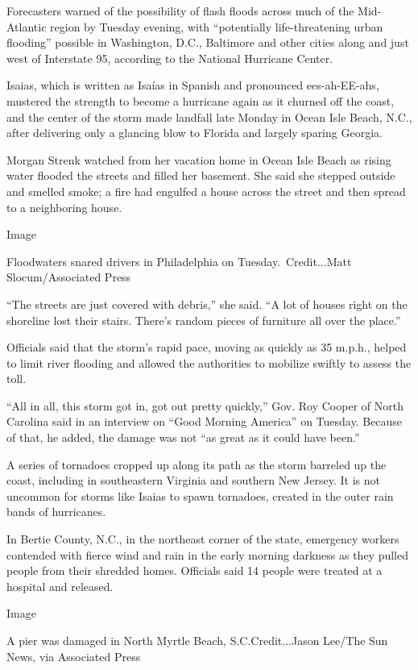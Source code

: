 Forecasters warned of the possibility of flash floods across much of the
Mid-Atlantic region by Tuesday evening, with ``potentially
life-threatening urban flooding'' possible in Washington, D.C.,
Baltimore and other cities along and just west of Interstate 95,
according to the National Hurricane Center.

Isaias, which is written as Isaías in Spanish and pronounced
ees-ah-EE-ahs, mustered the strength to become a hurricane again as it
churned off the coast, and the center of the storm made landfall late
Monday in Ocean Isle Beach, N.C., after delivering only a glancing blow
to Florida and largely sparing Georgia.

Morgan Strenk watched from her vacation home in Ocean Isle Beach as
rising water flooded the streets and filled her basement. She said she
stepped outside and smelled smoke; a fire had engulfed a house across
the street and then spread to a neighboring house.

Image

Floodwaters snared drivers in Philadelphia on Tuesday.~Credit...Matt
Slocum/Associated Press

``The streets are just covered with debris,'' she said. ``A lot of
houses right on the shoreline lost their stairs. There's random pieces
of furniture all over the place.''

Officials said that the storm's rapid pace, moving as quickly as 35
m.p.h., helped to limit river flooding and allowed the authorities to
mobilize swiftly to assess the toll.

``All in all, this storm got in, got out pretty quickly,'' Gov. Roy
Cooper of North Carolina said in an interview on ``Good Morning
America'' on Tuesday. Because of that, he added, the damage was not ``as
great as it could have been.''

A series of tornadoes cropped up along its path as the storm barreled up
the coast, including in southeastern Virginia and southern New Jersey.
It is not uncommon for storms like Isaias to spawn tornadoes, created in
the outer rain bands of hurricanes.

In Bertie County, N.C., in the northeast corner of the state, emergency
workers contended with fierce wind and rain in the early morning
darkness as they pulled people from their shredded homes. Officials said
14 people were treated at a hospital and released.

Image

A pier was damaged in North Myrtle Beach, S.C.Credit...Jason Lee/The Sun
News, via Associated Press

